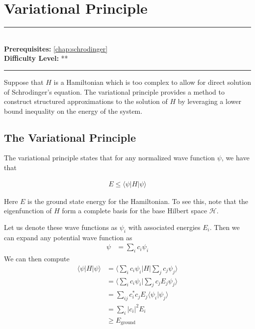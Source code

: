 \documentclass[book.tex]{subfiles}
\begin{document}
\chapter{Variational Principle}

\label{chap:quantum_variational}
\noindent\rule{11cm}{0.4pt} \\
\textbf{Prerequisites:}  \autoref{chap:schrodinger} \\
\textbf{Difficulty Level:} ** \\
\noindent\rule{11cm}{0.4pt}
\vspace{5mm}

Suppose that $H$ is a Hamiltonian which is too complex to allow for direct solution of Schrodinger's equation. The variational principle provides a method to construct structured approximations to the solution of $H$ by leveraging a lower bound inequality on the energy of the system. 
\section{The Variational Principle}
The variational principle states that for any normalized wave function $\psi$, we have that

\begin{align}
E \leq \langle \psi | H | \psi \rangle 
\end{align}

Here $E$ is the ground state energy for the Hamiltonian. To see this, note that the eigenfunction of $H$ form a complete basis for the base Hilbert space $\mathcal{H}$. %

Let us denote these wave functions as $\psi_i$ with associated energies $E_i$. Then we can expand any potential wave function as
\begin{align}
    \psi &= \sum_i c_i \psi_i
\end{align}
We can then compute
\begin{align}
    \langle \psi | H | \psi \rangle &= \Big \langle \sum_i c_i \psi_i \Big | H \Big | \sum_j c_j \psi_j \Big  \rangle \\
    &= \Big \langle \sum_i c_i \psi_i \Big | \sum_j c_j E_j \psi_j \Big \rangle \\
    &= \sum_{ij} c^*_i c_j E_j \langle \psi_i | \psi_j \rangle \\
    &= \sum_{i} |c_i|^2 E_i \\
    &\geq E_{\textrm{ground}}
\end{align}
\end{document}
